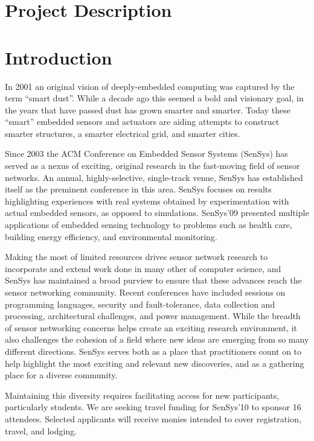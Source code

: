 \section*{Project Description}
\section{Introduction}

In 2001 an original vision of deeply-embedded computing was captured by the
term ``smart dust''. While a decade ago this seemed a bold and visionary goal,
in the years that have passed dust has grown smarter and smarter. Today these
``smart'' embedded sensors and actuators are aiding attempts to construct
smarter structures, a smarter electrical grid, and smarter cities.

Since 2003 the ACM Conference on Embedded Sensor Systems (SenSys) has served
as a nexus of exciting, original research in the fast-moving field of sensor
networks. An annual, highly-selective, single-track venue, SenSys has
established itself as the preminent conference in this area.
SenSys focuses on results highlighting experiences with real systems obtained
by experimentation with actual embedded sensors, as opposed to simulations.
SenSys'09 presented multiple applications of embedded sensing technology to
problems such as health care, building energy efficiency, and environmental
monitoring.

Making the most of limited resources drives sensor network research to
incorporate and extend work done in many other of computer science, and
SenSys has maintained a broad purview to ensure that these advances reach the
sensor networking community. Recent conferences have included sessions on
programming languages, security and fault-tolerance, data collection and
processing, architectural challenges, and power management. While the breadth
of sensor networking concerns helps create an exciting research environment,
it also challenges the cohesion of a field where new ideas are emerging from
so many different directions. SenSys serves both as a place that
practitioners count on to help highlight the most exciting and relevant new
discoveries, and as a gathering place for a diverse community.

Maintaining this diversity requires facilitating access for new participants,
particularly students. We are seeking travel funding for SenSys'10 to sponsor
16 attendees. Selected applicants will receive monies intended to cover
registration, travel, and lodging.

